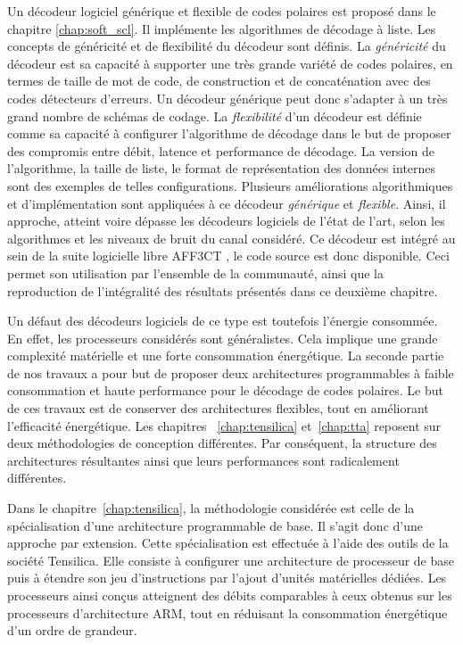 Un décodeur logiciel générique et flexible de codes polaires est proposé dans le chapitre \ref{chap:soft_scl}. Il implémente les algorithmes de décodage à liste. Les concepts de généricité et de flexibilité du décodeur sont définis. La \textit{généricité} du décodeur est sa capacité à supporter une très grande variété de codes polaires, en termes de taille de mot de code, de construction et de concaténation avec des codes détecteurs d'erreurs. Un décodeur générique peut donc s'adapter à un très grand nombre de schémas de codage. La \textit{flexibilité} d'un décodeur est définie comme sa capacité à configurer l'algorithme de décodage dans le but de proposer des compromis entre débit, latence et performance de décodage. La version de l'algorithme, la taille de liste, le format de représentation des données internes sont des exemples de telles configurations. Plusieurs améliorations algorithmiques et d'implémentation sont appliquées à ce décodeur \textit{générique} et \textit{flexible}. Ainsi, il approche, atteint voire dépasse les décodeurs logiciels de l'état de l'art, selon les algorithmes et les niveaux de bruit du canal considéré. Ce décodeur est intégré au sein de la suite logicielle libre AFF3CT , le code source est donc disponible. Ceci permet son utilisation par l'ensemble de la communauté, ainsi que la reproduction de l'intégralité des résultats présentés dans ce deuxième chapitre.

Un défaut des décodeurs logiciels de ce type est toutefois l'énergie consommée. En effet, les processeurs considérés sont généralistes. Cela implique une grande complexité matérielle et une forte consommation énergétique. La seconde partie de nos travaux a pour but de proposer deux architectures programmables à faible consommation et haute performance pour le décodage de codes polaires. Le but de ces travaux est de conserver des architectures flexibles, tout en améliorant l'efficacité énergétique. Les chapitres ~\ref{chap:tensilica} et~\ref{chap:tta} reposent sur deux méthodologies de conception différentes. Par conséquent, la structure des architectures résultantes ainsi que leurs performances sont radicalement différentes.

Dans le chapitre~\ref{chap:tensilica}, la méthodologie considérée est celle de la spécialisation d'une architecture programmable de base. Il s'agit donc d'une approche par extension. Cette spécialisation est effectuée à l'aide des outils de la société Tensilica. Elle consiste à configurer une architecture de processeur de base puis à étendre son jeu d'instructions par l'ajout d'unités matérielles dédiées. Les processeurs ainsi conçus atteignent des débits comparables à ceux obtenus sur les processeurs d'architecture ARM, tout en réduisant la consommation énergétique d'un ordre de grandeur. 

